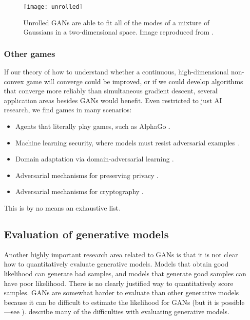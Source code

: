 \begin{figure}
  \centering
  \texttt{[image: unrolled]}
  \caption{Unrolled GANs are able to fit all of the modes of a mixture of Gaussians
    in a two-dimensional space. Image reproduced from \citet{metz2016unrolled}.
  }
  \label{fig:unrolled}
\end{figure}

\subsubsection{Other games}

If our theory of how to understand whether a continuous, high-dimensional non-convex game 
will converge could be improved, or if we could develop algorithms that converge 
more reliably than simultaneous gradient descent, several application areas besides GANs
would benefit.
Even restricted to just AI research, we find games in many scenarios:
\begin{itemize}
  \item Agents that literally play games, such as AlphaGo \citep{silver2016mastering}.
  \item Machine learning security, where models must resist adversarial examples \citep{Szegedy-ICLR2014,Goodfellow-2015-adversarial}.
  \item Domain adaptation via domain-adversarial learning \citep{ganin2015domain}.
  \item Adversarial mechanisms for preserving privacy \citep{edwards2015censoring}.
  \item Adversarial mechanisms for cryptography \citep{abadi2016learning}.
\end{itemize}
This is by no means an exhaustive list.

\subsection{Evaluation of generative models}

Another highly important research area related to GANs is that it is not clear
how to quantitatively evaluate generative models.
Models that obtain good likelihood can generate bad samples, and models that
generate good samples can have poor likelihood.
There is no clearly justified way to quantitatively score samples.
GANs are somewhat harder to evaluate than other generative models because
it can be difficult to estimate the likelihood for GANs
(but it is possible---see \citet{wu2016quantitative}).
\citet{Theis2015d} describe many of the difficulties with evaluating generative models.

